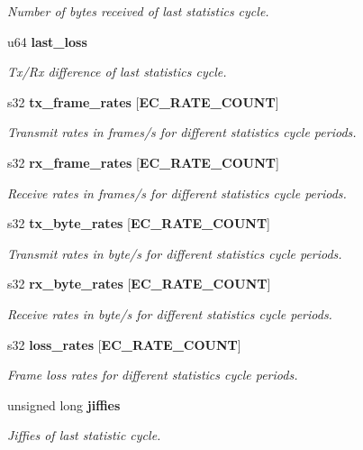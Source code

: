 \begin{DoxyCompactItemize}
\begin{DoxyCompactList}\small\item\em \-Number of bytes received of last statistics cycle. \end{DoxyCompactList}\item 
u64 {\bf last\-\_\-loss}
\begin{DoxyCompactList}\small\item\em \-Tx/\-Rx difference of last statistics cycle. \end{DoxyCompactList}\item 
s32 {\bf tx\-\_\-frame\-\_\-rates} [{\bf \-E\-C\-\_\-\-R\-A\-T\-E\-\_\-\-C\-O\-U\-N\-T}]\label{structec__device__stats__t_ae7ca9495a2d4254d7cb87655a1e5ea64}

\begin{DoxyCompactList}\small\item\em \-Transmit rates in frames/s for different statistics cycle periods. \end{DoxyCompactList}\item 
s32 {\bf rx\-\_\-frame\-\_\-rates} [{\bf \-E\-C\-\_\-\-R\-A\-T\-E\-\_\-\-C\-O\-U\-N\-T}]\label{structec__device__stats__t_a71c364775c6e39faf856d6569f4ac384}

\begin{DoxyCompactList}\small\item\em \-Receive rates in frames/s for different statistics cycle periods. \end{DoxyCompactList}\item 
s32 {\bf tx\-\_\-byte\-\_\-rates} [{\bf \-E\-C\-\_\-\-R\-A\-T\-E\-\_\-\-C\-O\-U\-N\-T}]
\begin{DoxyCompactList}\small\item\em \-Transmit rates in byte/s for different statistics cycle periods. \end{DoxyCompactList}\item 
s32 {\bf rx\-\_\-byte\-\_\-rates} [{\bf \-E\-C\-\_\-\-R\-A\-T\-E\-\_\-\-C\-O\-U\-N\-T}]
\begin{DoxyCompactList}\small\item\em \-Receive rates in byte/s for different statistics cycle periods. \end{DoxyCompactList}\item 
s32 {\bf loss\-\_\-rates} [{\bf \-E\-C\-\_\-\-R\-A\-T\-E\-\_\-\-C\-O\-U\-N\-T}]
\begin{DoxyCompactList}\small\item\em \-Frame loss rates for different statistics cycle periods. \end{DoxyCompactList}\item 
unsigned long {\bf jiffies}
\begin{DoxyCompactList}\small\item\em \-Jiffies of last statistic cycle. \end{DoxyCompactList}\end{DoxyCompactItemize}


